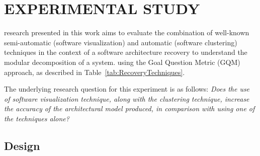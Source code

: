 \section{EXPERIMENTAL STUDY}\label{sec:experiment}

  research presented in this work  aims to evaluate the combination
of well-known semi-automatic (software visualization) and automatic (software clustering) techniques in the context of a software architecture recovery to understand the modular decomposition of a system.  using the Goal Question Metric (GQM) approach, as described in Table~\ref{tab:RecoveryTechniques}.
\begin{table}[!h]
	\centering
	\caption{Definition of the accuracy evaluation Software Architecture Recovery Techniques.}
	\label{tab:RecoveryTechniques}
\end{table}

The underlying research question for this experiment is as follows: 
\emph{Does the use of software visualization technique, along with the clustering technique, increase the accuracy of the architectural model produced, in comparison with using one of the techniques alone?}
  
\subsection{Design}%



